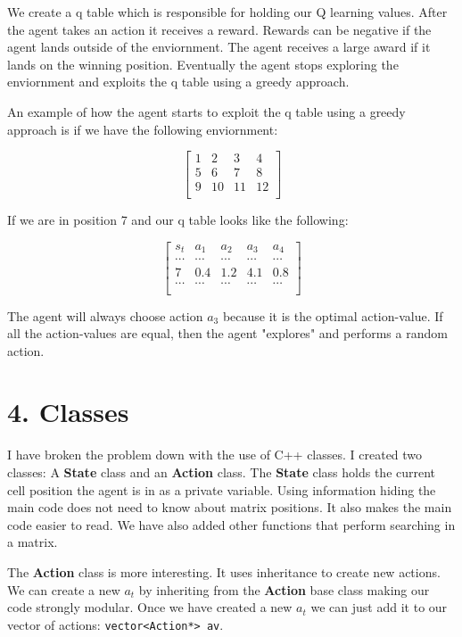 \documentclass[12pt]{article}
\begin{document}
We create a q table which is responsible for holding our Q learning values. After
the agent takes an action it receives a reward. Rewards can be 
negative if the agent lands outside of the enviornment. The agent
receives a large award if it lands on the winning position. Eventually
the agent stops exploring the enviornment and exploits the q table
using a greedy approach.

An example of how the agent starts to exploit the q table using a
greedy approach is if we have the following enviornment:

\[
  \left[ {\begin{array}{cccc}
    1 & 2 & 3 & 4 \\
    5 & 6 & 7 & 8 \\
    9 & 10 & 11 & 12 \\
  \end{array} } \right]
\]

If we are in position 7 and our q table looks like the following:

\[
  \left[ {\begin{array}{ccccc}
    s_t & a_1 & a_2 & a_3 & a_4 \\
    \cdots & \cdots & \cdots & \cdots & \cdots \\
    7 & 0.4 & 1.2 & 4.1 & 0.8 \\
    \cdots & \cdots & \cdots & \cdots & \cdots \\
  \end{array} } \right]
\]

The agent will always choose action $a_3$ because it is the
optimal action-value. If all the action-values are equal, then
the agent "explores" and performs a random action.

\section*{4. Classes}
I have broken the problem down with the use of C++ classes. I created two classes: A \textbf{State} class and an \textbf{Action} class. 
The \textbf{State} class holds the 
current cell position the agent is in as a private variable. Using information
hiding the main code does not need to know about matrix positions. It also makes the main code easier to read. We have also added other functions
that perform searching in a matrix.

The \textbf{Action} class is more interesting. It uses inheritance to create new
actions. We can create a new $a_t$ by inheriting from the \textbf{Action} base
class making our code strongly modular. Once we have created a new $a_t$
we can just add it to our vector of actions: \verb|vector<Action*> av|.
\end{document}
